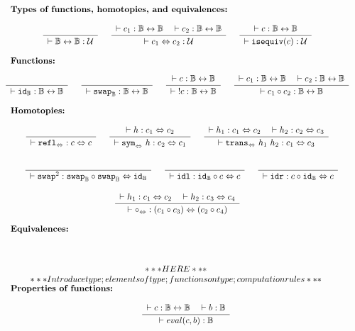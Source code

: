 \documentclass[format=acmlarge,review,natbib]{acmart}
\newcommand{\invc}[1]{!#1}
\newcommand{\compc}{\circ}
\newcommand{\evalone}[2]{eval(#1,#2)}
\newcommand{\reflh}{\mathtt{refl}_{\isotwo}}
\newcommand{\symh}[1]{\mathtt{sym}_{\isotwo}~#1}
\newcommand{\transh}[2]{\mathtt{trans}_{\isotwo}~#1~#2}
\newcommand{\isequiv}[1]{\mathtt{isequiv}(#1)}
\newcommand{\idc}{\mathtt{id}}
\newcommand{\swapc}{\mathtt{swap}}
\newcommand{\idlc}{\mathtt{idl}}
\newcommand{\idrc}{\mathtt{idr}}
\newcommand{\swapswap}{\swapc^2}
\newcommand{\compsim}{\compc_{\isotwo}}
\newcommand{\iso}{\leftrightarrow}
\newcommand{\isotwo}{\Leftrightarrow}
\newcommand{\boolt}{\mathbb{B}}
\newcommand{\univ}{\mathcal{U}}
\newcommand{\Rule}[2]{
\makebox{
$\displaystyle
\frac{\begin{array}{l}#1\\\end{array}}
{\begin{array}{l}#2\\\end{array}}$}}
\newcommand{\proves}{\vdash}
\newcommand{\jdg}[3]{#1 \proves #2 : #3}
\begin{document}
\[\begin{array}{c}
\noalign{\textbf{Types of functions, homotopies, and equivalences:}} \\
\Rule{}{\jdg{}{\boolt\iso\boolt}{\univ}}
\quad
\Rule{\jdg{}{c_1}{\boolt\iso\boolt}
         \quad\jdg{}{c_2}{\boolt\iso\boolt}}
        {\jdg{}{c_1 \isotwo c_2}{\univ}}
\quad
\Rule{\jdg{}{c}{\boolt\iso\boolt}}
        {\jdg{}{\isequiv{c}}{\univ}}
\\
\\
\noalign{\textbf{Functions:}} \\
\Rule{}{\jdg{}{\idc_{\boolt}}{\boolt\iso\boolt}}
\quad
\Rule{}{\jdg{}{\swapc_{\boolt}}{\boolt\iso\boolt}}
\quad
\Rule{\jdg{}{c}{\boolt\iso\boolt}}
        {\jdg{}{\;\invc{c}}{\boolt\iso\boolt}}
\quad
\Rule{\jdg{}{c_1}{\boolt\iso\boolt}
        \quad\jdg{}{c_2}{\boolt\iso\boolt}}
        {\jdg{}{c_1 \compc c_2}{\boolt\iso\boolt}}
\\
\\
\noalign{\textbf{Homotopies:}} \\
\Rule{}
         {\jdg{}{\reflh}{c \isotwo c}}
\quad
\Rule{\jdg{}{h}{c_1 \isotwo c_2}}
        {\jdg{}{\symh{h}}{c_2 \isotwo c_1}}
\quad
\Rule{\jdg{}{h_1}{c_1 \isotwo c_2}
         \quad\jdg{}{h_2}{c_2 \isotwo c_3}}
        {\jdg{}{\transh{h_1}{h_2}}{c_1 \isotwo c_3}}
\\
\\
\quad
\Rule{}{\jdg{}{\swapswap}{\swapc_{\boolt} \compc \swapc_{\boolt} \isotwo \idc_{\boolt}}}
\quad
\Rule{}
        {\jdg{}{\idlc}{\idc_{\boolt} \compc c \isotwo c}}
\quad
\Rule{}
        {\jdg{}{\idrc}{c \compc \idc_{\boolt} \isotwo c}}
\\
\\
\Rule{\jdg{}{h_1}{c_1 \isotwo c_2}
         \quad\jdg{}{h_2}{c_3 \isotwo c_4}}
        {\jdg{}{\compsim}{(c_1 \compc c_3) \isotwo (c_2 \compc c_4)}}
\\
\\
\noalign{\textbf{Equivalences:}} \\
\\
\\
***HERE*** \\
*** Introduce type; elements of type; functions on type; computation rules *** \\
\noalign{\textbf{Properties of functions:}} \\
\quad
\quad
\Rule{\jdg{}{c}{\boolt\iso\boolt}
         \quad\jdg{}{b}{\boolt}}
        {\jdg{}{\evalone{c}{b}}{\boolt}}
\\
\\

\end{array}\]
\end{document}
